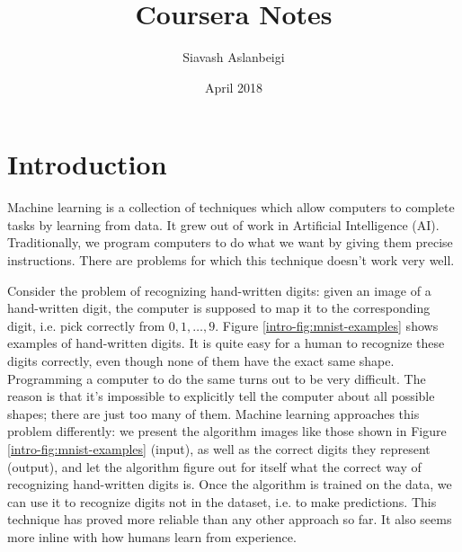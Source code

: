 \documentclass{article}
\title{Coursera Notes}
\author{Siavash Aslanbeigi}
\date{April 2018}
\theoremstyle{definition}
\begin{document}
\maketitle
\tableofcontents

\section{Introduction}
Machine learning is a collection of techniques which allow computers to complete tasks by learning from data. It grew out of work in Artificial Intelligence (AI). Traditionally, we program computers to do what we want by giving them precise instructions. There are problems for which this technique doesn't work very well. 

Consider the problem of recognizing hand-written digits: given an image of a hand-written digit, the computer is supposed to map it to the corresponding digit, i.e. pick correctly from $0,1,\dots,9$. Figure \ref{intro-fig:mnist-examples} shows examples of hand-written digits. It is quite easy for a human to recognize these digits correctly, even though none of them have the exact same shape. Programming a computer to do the same turns out to be very difficult. The reason is that it's impossible to explicitly tell the computer about all possible shapes; there are just too many of them. Machine learning approaches this problem differently: we present the algorithm images like those shown in Figure \ref{intro-fig:mnist-examples} (input), as well as the correct digits they represent (output), and let the algorithm figure out for itself what the correct way of recognizing hand-written digits is. Once the algorithm is trained on the data, we can use it to recognize digits not in the dataset, i.e. to make predictions. This technique has proved more reliable than any other approach so far. It also seems more inline with how humans learn from experience.
\end{document}
